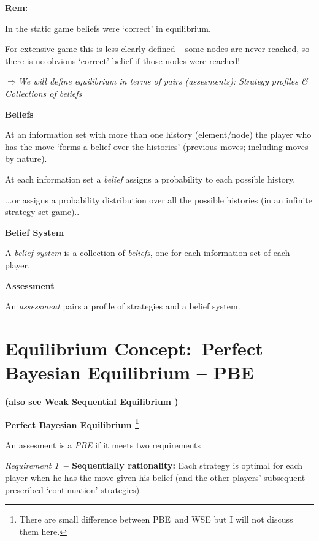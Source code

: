 \documentclass{article}
\begin{document}
\textbf{Rem: }\bigskip 

In the static game beliefs were `correct' in equilibrium.

\bigskip

For extensive game this is less clearly defined -- some nodes are never
reached, so there is no obvious `correct' belief if those nodes were reached!

\bigskip

$\mathbf{\Longrightarrow }$\textit{We will define equilibrium in terms of
pairs (assesments): Strategy profiles \& Collections of beliefs}

\bigskip

\textbf{Beliefs }

At an information set with more than one history (element/node) the player
who has the move `forms a belief over the histories' (previous moves;
including moves by nature).

At each information set a \textit{belief }assigns a probability to each
possible history,

...or assigns a probability distribution over all the possible histories (in
an infinite strategy set game)..

\bigskip

\textbf{Belief System}

A \textit{belief system }is a collection of \textit{beliefs}, one for each
information set of each player.

\bigskip 

\textbf{Assessment}

An \textit{assessment} pairs a profile of  strategies and a belief system.

\bigskip 

\bigskip 

\section{Equilibrium Concept:\ Perfect Bayesian Equilibrium -- PBE }

\textbf{(also see Weak Sequential Equilibrium )}

\bigskip 

\textbf{Perfect Bayesian Equilibrium \footnote{%
There are small difference between PBE\ and WSE but I will not discuss them
here.}}

An assesment is a \textit{PBE }if it meets two requirements

\bigskip

\textit{Requirement 1}\textbf{\ -- Sequentially rationality:} Each strategy
is optimal for each player when he has the move given his belief (and the
other players' subsequent prescribed `continuation' strategies)
\end{document}

